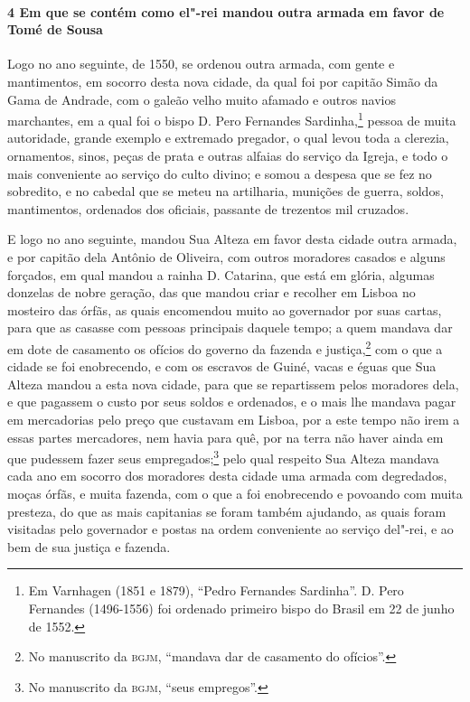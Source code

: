 \begin{linenumbers}
\paragraph{4 Em que se contém como el"-rei mandou outra armada em favor de Tomé de Sousa} \quad
Logo no ano seguinte, de 1550, se ordenou outra armada, com gente e mantimentos, em
socorro desta nova cidade, da qual foi por capitão Simão da Gama de Andrade, com o galeão
velho muito afamado e outros navios marchantes, em a qual foi o bispo D. Pero Fernandes
Sardinha,\footnote{ Em Varnhagen (1851 e 1879), ``Pedro Fernandes Sardinha''. D. Pero
Fernandes (1496-1556) foi ordenado primeiro bispo do Brasil em 22 de junho de 1552.}
pessoa de muita autoridade, grande exemplo e extremado pregador, o qual levou toda a
clerezia, ornamentos, sinos, peças de prata e outras alfaias do serviço da Igreja, e todo
o mais conveniente ao serviço do culto divino; e somou a despesa que se fez no sobredito,
e no cabedal que se meteu na artilharia, munições de guerra, soldos, mantimentos,
ordenados dos oficiais, passante de trezentos mil cruzados.

E logo no ano seguinte, mandou Sua Alteza em favor desta cidade outra armada, e por
capitão dela Antônio de Oliveira, com outros moradores casados e alguns forçados, em qual
mandou a rainha D. Catarina, que está em glória, algumas donzelas de nobre geração, das
que mandou criar e recolher em Lisboa no mosteiro das órfãs, as quais encomendou muito ao
governador por suas cartas, para que as casasse com pessoas principais daquele tempo; a
quem mandava dar em dote de casamento os ofícios do governo da fazenda e
justiça,\footnote{ No manuscrito da \textsc{bgjm}, ``mandava dar de casamento do
ofícios''.} com o que a cidade se foi enobrecendo, e com os escravos de Guiné, vacas e
éguas que Sua Alteza mandou a esta nova cidade, para que se repartissem pelos moradores
dela, e que pagassem o custo por seus soldos e ordenados, e o mais lhe mandava pagar em
mercadorias pelo preço que custavam em Lisboa, por a este tempo não irem a essas partes
mercadores, nem havia para quê, por na terra não haver ainda em que pudessem fazer seus
empregados;\footnote{ No manuscrito da \textsc{bgjm}, ``seus empregos''.} pelo qual
respeito Sua Alteza mandava cada ano em socorro dos moradores desta cidade uma armada com
degredados, moças órfãs, e muita fazenda, com o que a foi enobrecendo e povoando com muita
presteza, do que as mais capitanias se foram também ajudando, as quais foram visitadas
pelo governador e postas na ordem conveniente ao serviço del"-rei, e ao bem de sua justiça
e fazenda.


\end{linenumbers}
